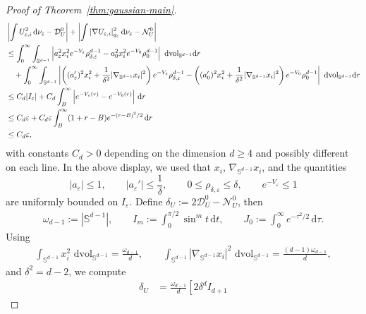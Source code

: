 \documentclass[11pt,reqno]{amsart}
\numberwithin{equation}{section}
\theoremstyle{definition}
\theoremstyle{remark}
\newcommand{\ud}{\mathrm{d}}
\newcommand{\0}{\emptyset}
\newcommand{\veps}{\varepsilon}
\newcommand{\bbS}{\mathbb S}
\newcommand{\calD}{\mathcal D}
\newcommand{\calN}{\mathcal N}
\newcommand{\dvol}{\,\mathrm{dvol}}
\begin{document}
\begin{proof}[Proof of Theorem~\ref{thm:gaussian-main}]
\begin{align}
        &\left|
        \int U_{\veps,i}^2\,\ud\nu_\veps-\calD_U^0
        \right|
        +
        \left|
        \int |\nabla U_{\veps,i}|_{g_\veps}^2\,\ud\nu_\veps-\calN_U^0
        \right| \notag\\
        &\leq
        \int_0^\infty\int_{\bbS^{d-1}}
        \left|
        a_\veps^2x_i^2 e^{-V_\veps}\rho_{\delta,\veps}^{d-1}
        -
        a_0^2x_i^2 e^{-V_0}\rho_0^{d-1}
        \right|
        \,\dvol_{\bbS^{d-1}}\ud r \notag\\
        &\quad+
        \int_0^\infty\int_{\bbS^{d-1}}
        \left|
        \left((a_\veps')^2x_i^2+\frac1{\delta^2}|\nabla_{\bbS^{d-1}}x_i|^2\right)
        e^{-V_\veps}\rho_{\delta,\veps}^{d-1}
        -
        \left((a_0')^2x_i^2+\frac1{\delta^2}|\nabla_{\bbS^{d-1}}x_i|^2\right)
        e^{-V_0}\rho_0^{d-1}
        \right|
        \,\dvol_{\bbS^{d-1}}\ud r \notag\\
        &\leq
        C_d |I_\veps|
        +
        C_d\int_B^\infty
        \left|e^{-V_\veps(r)}-e^{-V_0(r)}\right|\,\ud r \notag\\
        &\leq
        C_d\veps
        +
        C_d\veps
        \int_B^\infty
        (1+r-B)e^{-(r-B)^2/2}\,\ud r \notag\\
        &\leq
        C_d\veps,
\end{align}
with constants $C_d>0$ depending on the dimension $d\geq 4$ and possibly different on each line. In the above display, we used that \(x_i\), \(\nabla_{\bbS^{d-1}}x_i\), and the
quantities
\[
        |a_\veps|\leq 1,\qquad |a_\veps'|\leq \frac1\delta,\qquad
        0\leq \rho_{\delta,\veps}\leq \delta,\qquad e^{-V_\veps}\leq 1
\]
are uniformly bounded on \(I_\veps\). Define \(\delta_U:=2\calD_U^0-\calN_U^0\), then 
\begin{align}\label{eqn:notation}
        \omega_{d-1}:=|\mathbb S^{d-1}|,
        \qquad
        I_m:=\int_0^{\pi/2}\sin^m t\,\ud t,
        \qquad
        J_0:=\int_0^\infty e^{-\tau^2/2}\,\ud\tau.
\end{align}
Using
\begin{align}
        \int_{\mathbb S^{d-1}}x_i^2\,\dvol_{\mathbb S^{d-1}}
        =
        \frac{\omega_{d-1}}{d},
        \qquad
        \int_{\mathbb S^{d-1}}|\nabla_{\mathbb S^{d-1}}x_i|^2\,\dvol_{\mathbb S^{d-1}}
        =
        \frac{(d-1)\omega_{d-1}}{d},
\end{align}
and \(\delta^2=d-2\), we compute
\begin{align}
        \delta_U
        &=
        \frac{\omega_{d-1}}{d}
        \left[
        2\delta^d I_{d+1}

\end{align}
\end{proof}
\end{document}

